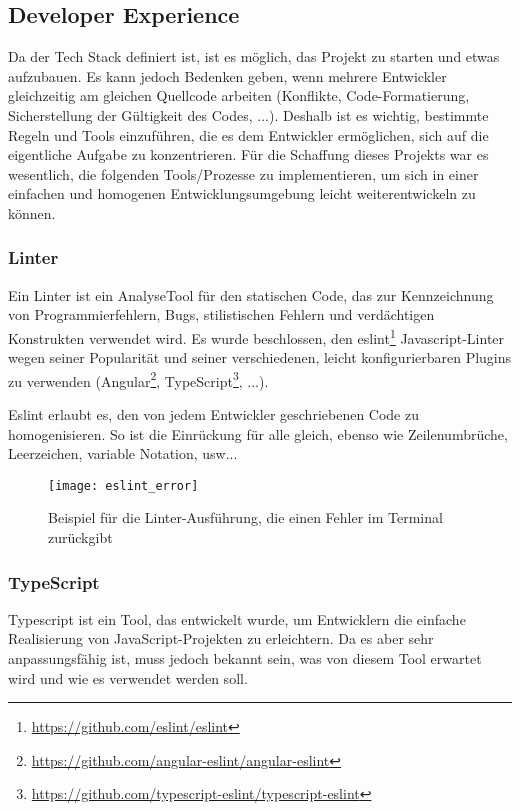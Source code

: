 \subsection{Developer Experience}
Da der Tech Stack definiert ist, ist es möglich, das Projekt zu starten und etwas aufzubauen.
Es kann jedoch Bedenken geben, wenn mehrere Entwickler gleichzeitig am gleichen Quellcode arbeiten (Konflikte, Code-Formatierung, Sicherstellung der Gültigkeit des Codes, ...).
Deshalb ist es wichtig, bestimmte Regeln und Tools einzuführen, die es dem Entwickler ermöglichen, sich auf die eigentliche Aufgabe zu konzentrieren.
Für die Schaffung dieses Projekts war es wesentlich, die folgenden Tools/Prozesse zu implementieren, um sich in einer einfachen und homogenen Entwicklungsumgebung leicht weiterentwickeln zu können.

\subsubsection{Linter}
Ein Linter ist ein AnalyseTool für den statischen Code, das zur Kennzeichnung von Programmierfehlern, Bugs, stilistischen Fehlern und verdächtigen Konstrukten verwendet wird.
Es wurde beschlossen, den eslint\footnote{\href{https://github.com/eslint/eslint}{https://github.com/eslint/eslint}} Javascript-Linter wegen seiner Popularität und seiner verschiedenen, leicht konfigurierbaren Plugins zu verwenden (Angular\footnote{\href{https://github.com/angular-eslint/angular-eslint}{https://github.com/angular-eslint/angular-eslint}}, TypeScript\footnote{\href{https://github.com/typescript-eslint/typescript-eslint}{https://github.com/typescript-eslint/typescript-eslint}}, ...).

Eslint erlaubt es, den von jedem Entwickler geschriebenen Code zu homogenisieren.
So ist die Einrückung für alle gleich, ebenso wie Zeilenumbrüche, Leerzeichen, variable Notation, usw...

\begin{figure}[h]
  \centering
  \texttt{[image: eslint\_error]}
  \caption{Beispiel für die Linter-Ausführung, die einen Fehler im Terminal zurückgibt}
\end{figure}

\subsubsection{TypeScript}

Typescript ist ein Tool, das entwickelt wurde, um Entwicklern die einfache Realisierung von JavaScript-Projekten zu erleichtern.
Da es aber sehr anpassungsfähig ist, muss jedoch bekannt sein, was von diesem Tool erwartet wird und wie es verwendet werden soll.

